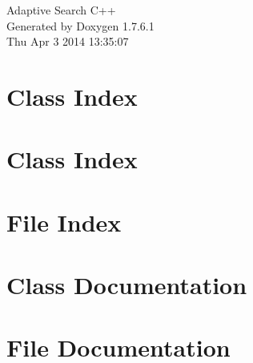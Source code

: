 \documentclass[a4paper]{book}
\begin{document}
\hypersetup{pageanchor=false,citecolor=blue}
\begin{titlepage}
\vspace*{7cm}
\begin{center}
{\Large \-Adaptive \-Search \-C++ }\\
\vspace*{1cm}
{\large \-Generated by Doxygen 1.7.6.1}\\
\vspace*{0.5cm}
{\small Thu Apr 3 2014 13:35:07}\\
\end{center}
\end{titlepage}
\clearemptydoublepage
{}
\tableofcontents
\clearemptydoublepage
{}
\hypersetup{pageanchor=true,citecolor=blue}
\chapter{\-Class \-Index}

\chapter{\-Class \-Index}

\chapter{\-File \-Index}

\chapter{\-Class \-Documentation}






















\chapter{\-File \-Documentation}
































\printindex
\end{document}
